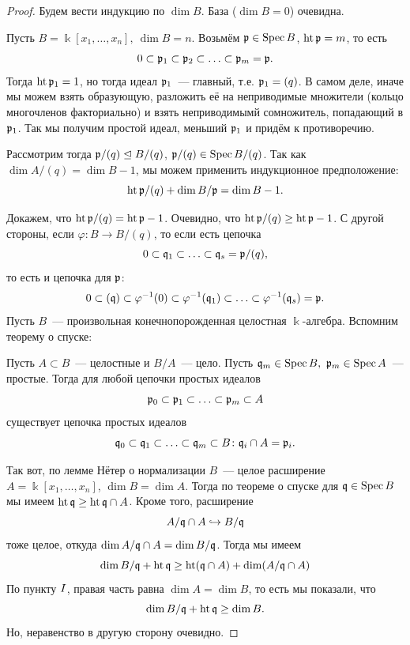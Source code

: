 	\begin{proof}
		Будем вести индукцию по $\dim{B}$. База ($\dim{B} = 0$) очевидна. 

		 Пусть $B = \Bbbk[x_1, \ldots, x_n], \ \dim{B} = n$. Возьмём $\mathfrak{p} \in \operatorname{Spec}{B}$, $\operatorname{ht}{\mathfrak{p}} = m$, то есть 
		\[
			0 \subset \mathfrak{p}_1 \subset \mathfrak{p}_2 \subset \ldots \subset \mathfrak{p}_m = \mathfrak{p}.
		\]
		Тогда $\operatorname{ht}{\mathfrak{p}_1} = 1$, но тогда идеал $\mathfrak{p}_1$~--- главный, т.е. $\mathfrak{p}_1 = (q)$. В самом деле, иначе мы можем взять образующую, разложить её на неприводимые множители (кольцо многочленов факториально) и взять неприводимымй сомножитель, попадающий в $\mathfrak{p}_1$. Так мы получим простой идеал, меньший $\mathfrak{p}_1$ и придём к противоречию. 

		Рассмотрим тогда $\mathfrak{p}/(q) \trianglelefteq B/(q)$, $\mathfrak{p}/(q) \in \operatorname{Spec}{B/(q)}$. Так как $\dim{A/(q)} = \dim{B} - 1$, мы можем применить индукционное предположение: 
		\[
			\operatorname{ht}{\mathfrak{p}/(q)} + \dim{B/\mathfrak{p}} = \dim{B} - 1. 
		\]

		Докажем, что $\operatorname{ht}{\mathfrak{p}/(q)} = \operatorname{ht}{\mathfrak{p}} - 1$. Очевидно, что $\operatorname{ht}{\mathfrak{p}/(q)} \ge \operatorname{ht}{\mathfrak{p}} - 1$. С другой стороны, если $\varphi\colon B \to B/(q)$, то если есть цепочка 
		\[
			0 \subset \mathfrak{q}_1 \subset \ldots \subset \mathfrak{q}_{s} = \mathfrak{p}/(q),
		\]
		то есть и цепочка для $\mathfrak{p}$:
		\[
			0 \subset (\mathfrak{q}) \subset \varphi^{-1}(0) \subset \varphi^{-1}(\mathfrak{q}_{1}) \subset \ldots \subset \varphi^{-1}(\mathfrak{q}_{s}) = \mathfrak{p}.
		\]
		 Пусть $B$~--- произвольная конечнопорожденная целостная $\Bbbk$-алгебра. Вспомним теорему о спуске: 

		\begin{theorem}[О спуске] 
			Пусть $A \subset B$~--- целостные и $B/A$~--- цело. Пусть $\mathfrak{q}_{m} \in \operatorname{Spec}{B}, \ \mathfrak{p}_m \in \operatorname{Spec}{A}$~--- простые. Тогда для любой цепочки простых идеалов
			\[
				\mathfrak{p}_0 \subset \mathfrak{p}_1 \subset \ldots \subset \mathfrak{p}_m \subset A
			\]
			существует цепочка простых идеалов 
			\[
				\mathfrak{q}_0 \subset \mathfrak{q}_1 \subset \ldots \subset \mathfrak{q}_m \subset B\colon \mathfrak{q}_i \cap A = \mathfrak{p}_i.
			\]
		\end{theorem}

		Так вот, по лемме Нётер о нормализации $B$~--- целое расширение $A = \Bbbk[x_1, \ldots, x_n]$, $\dim{B} = \dim{A}$. Тогда по теореме о спуске для $\mathfrak{q} \in \operatorname{Spec}{B}$ мы имеем $\operatorname{ht}{\mathfrak{q}} \ge \operatorname{ht}{\mathfrak{q} \cap A}$. Кроме того, расширение 
		\[
			A/\mathfrak{q} \cap A \hookrightarrow B/\mathfrak{q}
		\]
		тоже целое, откуда $\dim{A/\mathfrak{q}\cap A} = \dim{B/\mathfrak{q}}$.  Тогда мы имеем 
		\[
			\dim{B/\fq} + \Ht{\fq} \ge \Ht\lr*{\fq \cap A} + \dim\lr*{A/\fq \cap A}
		\]
		По пункту $\RNum{1}$, правая часть равна $\dim{A} = \dim{B}$, то есть мы показали, что 
		\[
			\dim{B/\mathfrak{q}} + \operatorname{ht}{\mathfrak{q}} \ge \dim{B}.
		\]
		Но, неравенство в другую сторону очевидно.

	\end{proof}

